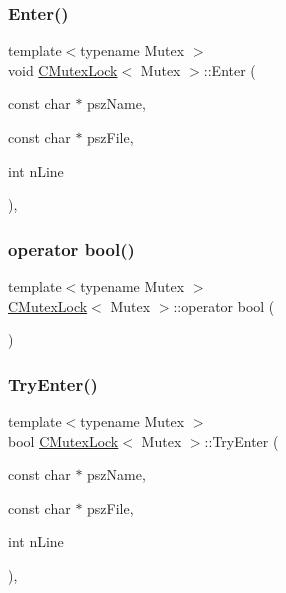 \subsubsection{\texorpdfstring{Enter()}{Enter()}}
{\footnotesize\ttfamily template$<$typename Mutex $>$ \\
void \mbox{\hyperlink{class_c_mutex_lock}{C\+Mutex\+Lock}}$<$ Mutex $>$\+::Enter (\begin{DoxyParamCaption}\item[{const char $\ast$}]{psz\+Name,  }\item[{const char $\ast$}]{psz\+File,  }\item[{int}]{n\+Line }\end{DoxyParamCaption})\hspace{0.3cm}{\ttfamily [inline]}, {\ttfamily [private]}}

\mbox{\label{class_c_mutex_lock_a4358803c87a873252abebdd1b625d293}} 
\subsubsection{\texorpdfstring{operator bool()}{operator bool()}}
{\footnotesize\ttfamily template$<$typename Mutex $>$ \\
\mbox{\hyperlink{class_c_mutex_lock}{C\+Mutex\+Lock}}$<$ Mutex $>$\+::operator bool (\begin{DoxyParamCaption}{ }\end{DoxyParamCaption})\hspace{0.3cm}{\ttfamily [inline]}}

\mbox{\label{class_c_mutex_lock_a9ba3770fa3e256a183b0ee52ebf048c4}} 
\subsubsection{\texorpdfstring{Try\+Enter()}{TryEnter()}}
{\footnotesize\ttfamily template$<$typename Mutex $>$ \\
bool \mbox{\hyperlink{class_c_mutex_lock}{C\+Mutex\+Lock}}$<$ Mutex $>$\+::Try\+Enter (\begin{DoxyParamCaption}\item[{const char $\ast$}]{psz\+Name,  }\item[{const char $\ast$}]{psz\+File,  }\item[{int}]{n\+Line }\end{DoxyParamCaption})\hspace{0.3cm}{\ttfamily [inline]}, {\ttfamily [private]}}



